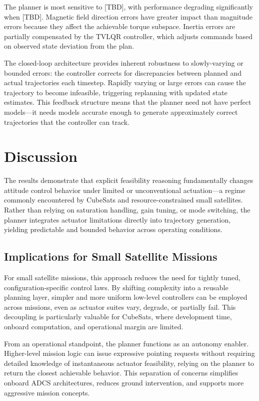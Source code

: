 \documentclass[conference]{IEEEtran}
\begin{document}
The planner is most sensitive to [TBD], with performance degrading significantly when [TBD]. Magnetic field direction errors have greater impact than magnitude errors because they affect the achievable torque subspace. Inertia errors are partially compensated by the TVLQR controller, which adjusts commands based on observed state deviation from the plan.

The closed-loop architecture provides inherent robustness to slowly-varying or bounded errors: the controller corrects for discrepancies between planned and actual trajectories each timestep. Rapidly varying or large errors can cause the trajectory to become infeasible, triggering replanning with updated state estimates. This feedback structure means that the planner need not have perfect models---it needs models accurate enough to generate approximately correct trajectories that the controller can track.


\section{Discussion}\label{sec:discussion}

The results demonstrate that explicit feasibility reasoning fundamentally changes attitude control behavior under limited or unconventional actuation---a regime commonly encountered by CubeSats and resource-constrained small satellites. Rather than relying on saturation handling, gain tuning, or mode switching, the planner integrates actuator limitations directly into trajectory generation, yielding predictable and bounded behavior across operating conditions.

\subsection{Implications for Small Satellite Missions}\label{subsec:implications}

For small satellite missions, this approach reduces the need for tightly tuned, configuration-specific control laws. By shifting complexity into a reusable planning layer, simpler and more uniform low-level controllers can be employed across missions, even as actuator suites vary, degrade, or partially fail. This decoupling is particularly valuable for CubeSats, where development time, onboard computation, and operational margin are limited.

From an operational standpoint, the planner functions as an autonomy enabler. Higher-level mission logic can issue expressive pointing requests without requiring detailed knowledge of instantaneous actuator feasibility, relying on the planner to return the closest achievable behavior. This separation of concerns simplifies onboard ADCS architectures, reduces ground intervention, and supports more aggressive mission concepts.
\end{document}
